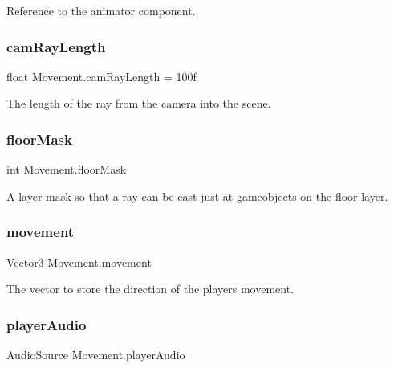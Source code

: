 Reference to the animator component. \mbox{\label{class_movement_a1951fc837158541258958a593fd2ba5e}} 
\subsubsection{\texorpdfstring{camRayLength}{camRayLength}}
{\footnotesize\ttfamily float Movement.\+cam\+Ray\+Length = 100f\hspace{0.3cm}{\ttfamily [private]}}

The length of the ray from the camera into the scene. \mbox{\label{class_movement_a2f50f37e86cb6008f7a9553bec88a064}} 
\subsubsection{\texorpdfstring{floorMask}{floorMask}}
{\footnotesize\ttfamily int Movement.\+floor\+Mask\hspace{0.3cm}{\ttfamily [private]}}

A layer mask so that a ray can be cast just at gameobjects on the floor layer. \mbox{\label{class_movement_a8d56dc9363b52aaf18d635fea6f85b57}} 
\subsubsection{\texorpdfstring{movement}{movement}}
{\footnotesize\ttfamily Vector3 Movement.\+movement\hspace{0.3cm}{\ttfamily [private]}}

The vector to store the direction of the player\textquotesingle{}s movement. \mbox{\label{class_movement_a91fa059bfde2c3fa3423fe308ec7c4ed}} 
\subsubsection{\texorpdfstring{playerAudio}{playerAudio}}
{\footnotesize\ttfamily Audio\+Source Movement.\+player\+Audio\hspace{0.3cm}{\ttfamily [private]}}

